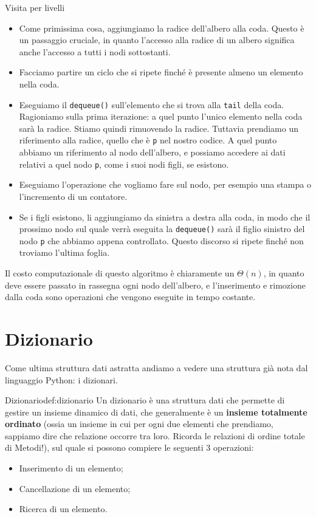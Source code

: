 \documentclass[12pt]{report}
\begin{document}
	\begin{algoritmo}{Visita per livelli}{}
		\begin{itemize}
			\item Come primissima cosa, aggiungiamo la radice dell'albero alla coda. Questo è un passaggio cruciale, in quanto l'accesso alla radice di un albero significa anche l'accesso a tutti i nodi sottostanti.
			\item Facciamo partire un ciclo che si ripete finché è presente almeno un elemento nella coda.
			\item Eseguiamo il \texttt{dequeue()} sull'elemento che si trova alla \texttt{tail} della coda. Ragioniamo sulla prima iterazione: a quel punto l'unico elemento nella coda sarà la radice. Stiamo quindi rimuovendo la radice. Tuttavia prendiamo un riferimento alla radice, quello che è \texttt{p} nel nostro codice. A quel punto abbiamo un riferimento al nodo dell'albero, e possiamo accedere ai dati relativi a quel nodo \texttt{p}, come i suoi nodi figli, se esistono.
			\item Eseguiamo l'operazione che vogliamo fare sul nodo, per esempio una stampa o l'incremento di un contatore.
			\item Se i figli esistono, li aggiungiamo da sinistra a destra alla coda, in modo che il prossimo nodo sul quale verrà eseguita la \texttt{dequeue()} sarà il figlio sinistro del nodo \texttt{p} che abbiamo appena controllato. Questo discorso si ripete finché non troviamo l'ultima foglia.
		\end{itemize}
	\end{algoritmo}
	
	Il costo computazionale di questo algoritmo è chiaramente un $\Theta(n)$, in quanto deve essere passato in rassegna ogni nodo dell'albero, e l'inserimento e rimozione dalla coda sono operazioni che vengono eseguite in tempo costante.
	
	\section{Dizionario}
	Come ultima struttura dati astratta andiamo a vedere una struttura già nota dal linguaggio Python: i dizionari.
	
	\begin{definizione}{Dizionario}{def:dizionario}
		Un dizionario è una struttura dati che permette di gestire un insieme dinamico di dati, che generalmente è un \textbf{insieme totalmente ordinato} (ossia un insieme in cui per ogni due elementi che prendiamo, sappiamo dire che relazione occorre tra loro. Ricorda le relazioni di ordine totale di Metodi!), sul quale si possono compiere le seguenti 3 operazioni:
		\begin{itemize}
			\item Inserimento di un elemento;
			\item Cancellazione di un elemento;
			\item Ricerca di un elemento.
		\end{itemize}
	\end{definizione}
	
\end{document}
